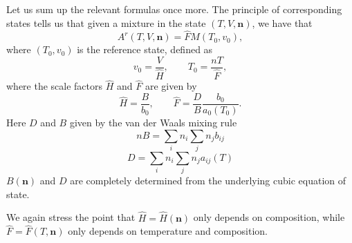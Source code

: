 \documentclass[english]{../thermomemo/thermomemo}
\newcommand{\mbn}[0]{\mathbf n}
\newcommand*{\hF}[0]{\hat F}
\newcommand*{\hH}[0]{\hat H}
\numberwithin{equation}{section}
\begin{document}
Let us sum up the relevant formulas once more. The principle of
corresponding states tells us that given a mixture in the state
$(T,V,\mbn)$, we have that
\begin{equation}
  A^r(T,V,\mbn) = \hat F M(T_0,v_0),
\end{equation}
where $(T_0,v_0)$ is the reference state, defined as
\begin{equation}
  v_0 = \frac{V}{\hat H}, \qquad T_0 = \frac{nT}{\hat F},
\end{equation}
where the scale factors $\hat H$ and $\hat F$ are given by
\begin{equation}
  \hat H = \frac{B}{b_0}, \qquad \hat F = \frac{D}{B} \frac{b_0}{a_0(T_0)}.
\end{equation}
Here $D$ and $B$ given by the van der Waals mixing rule
\begin{equation}
  nB = \sum_{i} n_i \sum_j n_j b_{ij}
\end{equation}
\begin{equation}
  D = \sum_{i} n_i \sum_j n_j a_{ij}(T)
\end{equation}
$B(\mbn)$ and $D$ are completely determined from the underlying cubic
equation of state.

We again stress the point that $\hH = \hH(\mbn)$ only depends on
composition, while $\hF = \hF(T,\mbn)$ only depends on temperature and
composition.
\end{document}
